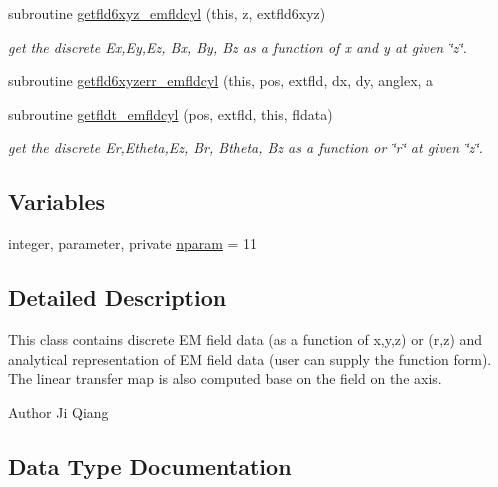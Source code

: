 \begin{DoxyCompactItemize}
subroutine \mbox{\hyperlink{namespaceemfldcylclass_a6e565db42720101fd24fc991842be210}{getfld6xyz\+\_\+emfldcyl}} (this, z, extfld6xyz)
\begin{DoxyCompactList}\small\item\em get the discrete Ex,Ey,Ez, Bx, By, Bz as a function of x and y at given \char`\"{}z\char`\"{}. \end{DoxyCompactList}\item 
subroutine \mbox{\hyperlink{namespaceemfldcylclass_a36c2a6787aeb8c71d2f4886e40e2e0e2}{getfld6xyzerr\+\_\+emfldcyl}} (this, pos, extfld, dx, dy, anglex, a
\item 
subroutine \mbox{\hyperlink{namespaceemfldcylclass_a82e58a65bbe911b6f676ddb81868db31}{getfldt\+\_\+emfldcyl}} (pos, extfld, this, fldata)
\begin{DoxyCompactList}\small\item\em get the discrete Er,Etheta,Ez, Br, Btheta, Bz as a function or \char`\"{}r\char`\"{} at given \char`\"{}z\char`\"{}. \end{DoxyCompactList}\end{DoxyCompactItemize}
\subsection*{Variables}
\begin{DoxyCompactItemize}
\item 
integer, parameter, private \mbox{\hyperlink{namespaceemfldcylclass_a4b336ecf0cd4052beb8ac386391e19e9}{nparam}} = 11
\end{DoxyCompactItemize}


\subsection{Detailed Description}
This class contains discrete EM field data (as a function of x,y,z) or (r,z) and analytical representation of EM field data (user can supply the function form). The linear transfer map is also computed base on the field on the axis. 

\begin{DoxyAuthor}{Author}
Ji Qiang 
\end{DoxyAuthor}


\subsection{Data Type Documentation}
\label{structemfldcylclass_1_1emfldcyl}
